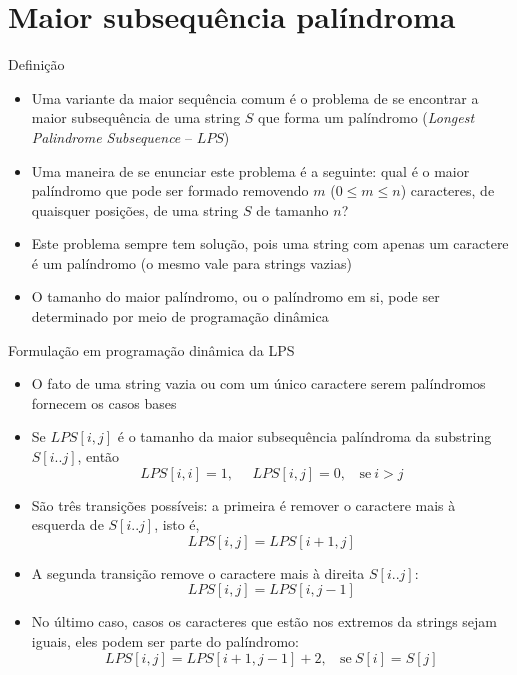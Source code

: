 \section{Maior subsequência palíndroma}

\begin{frame}[fragile]{Definição}

    \begin{itemize}
        \item Uma variante da maior sequência comum é o problema de se encontrar a maior 
            subsequência de uma string $S$ que forma um palíndromo (\textit{Longest Palindrome 
            Subsequence} -- $LPS$)

        \item Uma maneira de se enunciar este problema é a seguinte: qual é o maior palíndromo que 
            pode ser formado removendo $m$ ($0 \leq m \leq n$) caracteres, de quaisquer posições, 
            de uma string $S$ de tamanho $n$?

        \item Este problema sempre tem solução, pois uma string com apenas um caractere é um 
            palíndromo (o mesmo vale para strings vazias)

        \item O tamanho do maior palíndromo, ou o palíndromo em si, pode ser determinado por
            meio de programação dinâmica
    \end{itemize}
\end{frame}

\begin{frame}[fragile]{Formulação em programação dinâmica da LPS}

    \begin{itemize}
        \item O fato de uma string vazia ou com um único caractere serem palíndromos fornecem os
            casos bases

        \item Se $LPS[i,j]$ é o tamanho da maior subsequência palíndroma da substring 
            $S[i..j]$, então
            \[
                LPS[i,i] = 1, \ \ \ \ \ \ LPS[i,j] = 0, \ \ \ \ \mbox{se}\ i > j
            \]

        \item São três transições possíveis:
        a primeira é remover o caractere mais à esquerda de $S[i..j]$, isto é,
        \[
             LPS[i,j] = LPS[i+1,j]
        \]

        \item A segunda transição remove o caractere mais à direita $S[i..j]$:
        \[
            LPS[i, j] = LPS[i, j - 1]
        \] 

        \item No último caso, casos os caracteres que estão nos extremos da strings sejam iguais, 
            eles podem ser parte do palíndromo: 
        \[
            LPS[i,j] = LPS[i+1,j-1] + 2,\ \ \ \ \mbox{se}\ S[i] = S[j]
        \]

    \end{itemize}

\end{frame}

